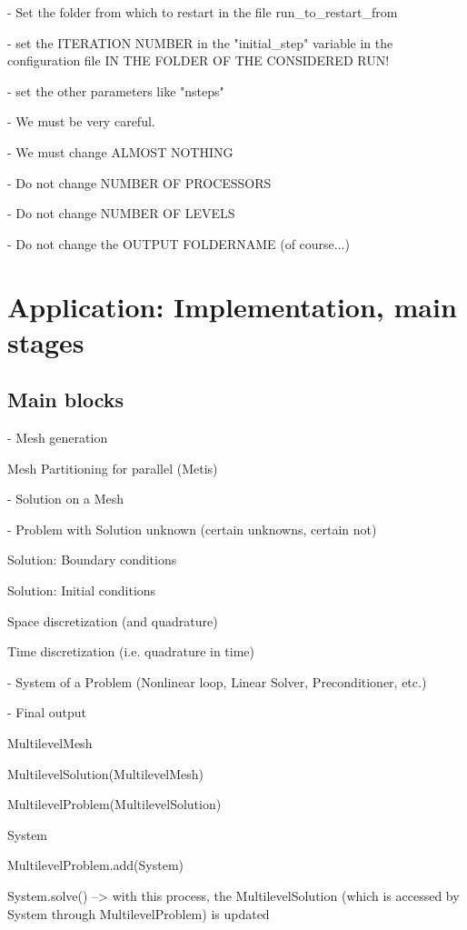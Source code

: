 \documentclass[10pt]{book}
\begin{document}
- Set the folder from which to restart in the file run\_to\_restart\_from

- set the ITERATION NUMBER in the "initial\_step" variable in the configuration file IN THE FOLDER OF THE CONSIDERED RUN!

- set the other parameters like "nsteps"


- We must be very careful.

- We must change ALMOST NOTHING

- Do not change NUMBER OF PROCESSORS

- Do not change NUMBER OF LEVELS

- Do not change the OUTPUT FOLDERNAME (of course...)




\part{Application: Implementation, main stages}

  
   \chapter{Main blocks}


 
 - Mesh generation
 
   Mesh Partitioning for parallel (Metis)
 
 - Solution on a Mesh

 - Problem with Solution unknown (certain unknowns, certain not)
 
 Solution: Boundary conditions
 
 Solution: Initial conditions
 
 Space discretization (and quadrature)
 
 Time discretization (i.e. quadrature in time)
 
 - System of a Problem (Nonlinear loop, Linear Solver, Preconditioner, etc.)
 
 - Final output
 
 
 
 

  
  MultilevelMesh
  
  MultilevelSolution(MultilevelMesh)
  
   MultilevelProblem(MultilevelSolution)

   System
   
   MultilevelProblem.add(System)
   
   System.solve() --> with this process, the MultilevelSolution (which is accessed by System through MultilevelProblem) is updated
   
\end{document}
